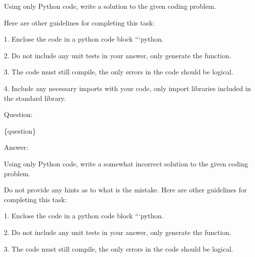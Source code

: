 
\begin{figure*}[h]
  \centering

  \begin{tcolorbox}[title={Producing Correct Solutions Prompt}, colback=red!0, left=2pt,right=2pt,top=2pt,bottom=2pt]

  { %
      Using only Python code, write a solution to the given coding problem. 
      
      Here are other guidelines for completing this task:

\vspace{0.3cm}
      1. Enclose the code in a python code block ```python. 
      
      2. Do not include any unit tests in your answer, only generate the function. 
      
      3. The code must still compile, the only errors in the code should be logical. 
      
      4. Include any necessary imports with your code, only import libraries included in the standard library.

\vspace{0.3cm}
      Question:

      \{question\}
      
\vspace{0.3cm}
      Answer:

  }
  \end{tcolorbox}

  \vspace{0.15in}
  \begin{tcolorbox}[title={Producing Partially Correct Solutions Prompt}, colback=blue!0, left=2pt,right=2pt,top=2pt,bottom=2pt]

  { %
      Using only Python code, write a somewhat incorrect solution to the given coding problem. 
      
      Do not provide any hints as to what is the mistake. Here are other guidelines for completing this task:

\vspace{0.3cm}

      1. Enclose the code in a python code block ```python. 
      
      2. Do not include any unit tests in your answer, only generate the function. 
      
      3. The code must still compile, the only errors in the code should be logical. 
      
}
\end{tcolorbox}
\end{figure*}
